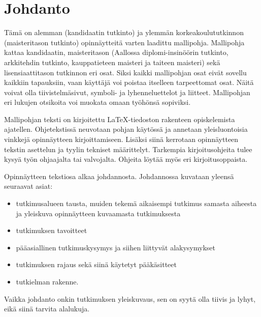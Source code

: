 \documentclass[finnish, 12pt, a4paper, arts, utf8, a-2b, online]{aaltothesis}
\begin{document}
\cleardoublepage

\section{Johdanto}
\label{luk:johdanto}

Tämä on alemman (kandidaatin tutkinto) ja ylemmän korkeakoulututkinnon
(maisteritason tutkinto) opinnäytteitä varten laadittu mallipohja. Mallipohja
kattaa kandidaatin, maisteritason (Aallossa diplomi-insinöörin tutkinto, 
arkkitehdin tutkinto, kauppatieteen maisteri ja taiteen maisteri) sekä 
lisensiaattitason tutkinnon eri osat. Siksi kaikki mallipohjan osat eivät 
sovellu kaikkiin tapauksiin, vaan käyttäjä voi poistaa itselleen tarpeettomat 
osat. Näitä voivat olla tiivistelmäsivut, symboli- ja lyhenneluettelot ja 
liitteet. Mallipohjan eri lukujen otsikoita voi muokata omaan työhönsä 
sopiviksi.

Mallipohjan teksti on kirjoitettu \LaTeX-tiedoston rakenteen opiskelemista 
ajatellen. Ohjetekstissä neuvotaan pohjan käytössä ja annetaan yleisluontoisia
vinkkejä opinnäytteen kirjoittamiseen. Lisäksi siinä kerrotaan opinnäytteen
tekstin asettelun ja tyylin tekniset määrittelyt. Tarkempia kirjoitusohjeita 
tulee kysyä työn ohjaajalta tai valvojalta. Ohjeita löytää myös eri 
kirjoitusoppaista.

Opinnäytteen tekstiosa alkaa johdannosta. Johdannossa kuvataan yleensä seuraavat 
asiat:
\begin{itemize}
	\item[--] tutkimusalueen tausta, muiden tekemä aikaisempi tutkimus samasta 
	aiheesta ja yleiskuva opinnäytteen kuvaamasta tutkimuksesta
	\item[--] tutkimuksen tavoitteet
	\item[--] pääasiallinen tutkimuskysymys ja siihen liittyvät alakysymykset
	\item[--] tutkimuksen rajaus sekä siinä käytetyt pääkäsitteet
	\item[--] tutkielman rakenne.
\end{itemize}

Vaikka johdanto onkin tutkimuksen yleiskuvaus, sen on syytä olla tiivis ja 
lyhyt, eikä siinä tarvita alalukuja.
\end{document}
